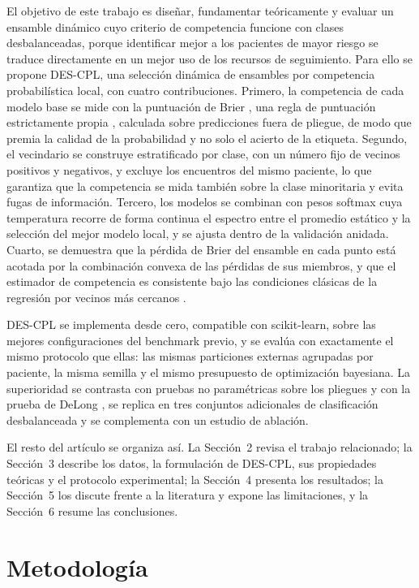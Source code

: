 \documentclass[pdflatex,sn-mathphys-num]{sn-jnl}
\begin{document}
El objetivo de este trabajo es diseñar, fundamentar teóricamente y evaluar un ensamble dinámico cuyo criterio de competencia funcione con clases desbalanceadas, porque identificar mejor a los pacientes de mayor riesgo se traduce directamente en un mejor uso de los recursos de seguimiento. Para ello se propone DES-CPL, una selección dinámica de ensambles por competencia probabilística local, con cuatro contribuciones. Primero, la competencia de cada modelo base se mide con la puntuación de Brier \cite{bib_brier}, una regla de puntuación estrictamente propia \cite{bib_gneiting_2007}, calculada sobre predicciones fuera de pliegue, de modo que premia la calidad de la probabilidad y no solo el acierto de la etiqueta. Segundo, el vecindario se construye estratificado por clase, con un número fijo de vecinos positivos y negativos, y excluye los encuentros del mismo paciente, lo que garantiza que la competencia se mida también sobre la clase minoritaria y evita fugas de información. Tercero, los modelos se combinan con pesos softmax cuya temperatura recorre de forma continua el espectro entre el promedio estático y la selección del mejor modelo local, y se ajusta dentro de la validación anidada. Cuarto, se demuestra que la pérdida de Brier del ensamble en cada punto está acotada por la combinación convexa de las pérdidas de sus miembros, y que el estimador de competencia es consistente bajo las condiciones clásicas de la regresión por vecinos más cercanos \cite{bib_stone_1977}.

DES-CPL se implementa desde cero, compatible con scikit-learn, sobre las mejores configuraciones del benchmark previo, y se evalúa con exactamente el mismo protocolo que ellas: las mismas particiones externas agrupadas por paciente, la misma semilla y el mismo presupuesto de optimización bayesiana. La superioridad se contrasta con pruebas no paramétricas sobre los pliegues y con la prueba de DeLong \cite{bib_demsar, bib_delong}, se replica en tres conjuntos adicionales de clasificación desbalanceada y se complementa con un estudio de ablación.

El resto del artículo se organiza así. La Sección~2 revisa el trabajo relacionado; la Sección~3 describe los datos, la formulación de DES-CPL, sus propiedades teóricas y el protocolo experimental; la Sección~4 presenta los resultados; la Sección~5 los discute frente a la literatura y expone las limitaciones, y la Sección~6 resume las conclusiones.

\section{Metodología}\label{sec:metodologia}
\end{document}
